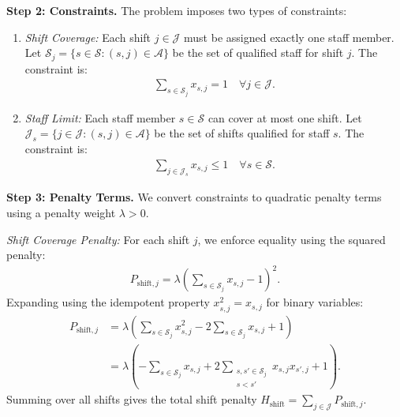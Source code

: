 \documentclass[12pt]{article}
\begin{document}
\textbf{Step 2: Constraints.}
The problem imposes two types of constraints:
\begin{enumerate}
    \item \textit{Shift Coverage:} Each shift $j \in \mathcal{J}$ must be assigned exactly one staff member. Let $\mathcal{S}_j = \{s \in \mathcal{S} : (s,j) \in \mathcal{A}\}$ be the set of qualified staff for shift $j$. The constraint is:
    \begin{align}
        \sum_{s \in \mathcal{S}_j} x_{s,j} = 1 \quad \forall j \in \mathcal{J}.
    \end{align}
    \item \textit{Staff Limit:} Each staff member $s \in \mathcal{S}$ can cover at most one shift. Let $\mathcal{J}_s = \{j \in \mathcal{J} : (s,j) \in \mathcal{A}\}$ be the set of shifts qualified for staff $s$. The constraint is:
    \begin{align}
        \sum_{j \in \mathcal{J}_s} x_{s,j} \le 1 \quad \forall s \in \mathcal{S}.
    \end{align}
\end{enumerate}

\textbf{Step 3: Penalty Terms.}
We convert constraints to quadratic penalty terms using a penalty weight $\lambda > 0$.

\textit{Shift Coverage Penalty:}
For each shift $j$, we enforce equality using the squared penalty:
\begin{align}
    P_{\text{shift},j} = \lambda \left( \sum_{s \in \mathcal{S}_j} x_{s,j} - 1 \right)^2.
\end{align}
Expanding using the idempotent property $x_{s,j}^2 = x_{s,j}$ for binary variables:
\begin{align}
    P_{\text{shift},j} &= \lambda \left( \sum_{s \in \mathcal{S}_j} x_{s,j}^2 - 2 \sum_{s \in \mathcal{S}_j} x_{s,j} + 1 \right) \\
    &= \lambda \left( -\sum_{s \in \mathcal{S}_j} x_{s,j} + 2 \sum_{\substack{s,s' \in \mathcal{S}_j \\ s < s'}} x_{s,j} x_{s',j} + 1 \right).
\end{align}
Summing over all shifts gives the total shift penalty $H_{\text{shift}} = \sum_{j \in \mathcal{J}} P_{\text{shift},j}$.
\end{document}
